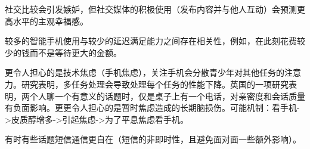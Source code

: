 社交比较会引发嫉妒，但社交媒体的积极使用（发布内容并与他人互动）会预测更高水平的主观幸福感。

 
 较多的智能手机使用与较少的延迟满足能力之间存在相关性，例如，在此刻花费较少的钱而不是等待更大的金额。


更令人担心的是技术焦虑（手机焦虑），关注手机会分散青少年对其他任务的注意力。研究表明，多任务处理会导致处理每个任务的性能下降。英国的一项研究表明，两个人聊一个有意义的话题时，仅是桌子上有一个电话，对亲密度和会话质量有负面影响。更更令人担心的是暂时焦虑造成的长期脑损伤。可能机制：看手机->皮质醇增多->引起焦虑->为了平息焦虑看手机。

有时有些话题短信通信更自在（短信的非即时性，且避免面对面一些额外影响）。

